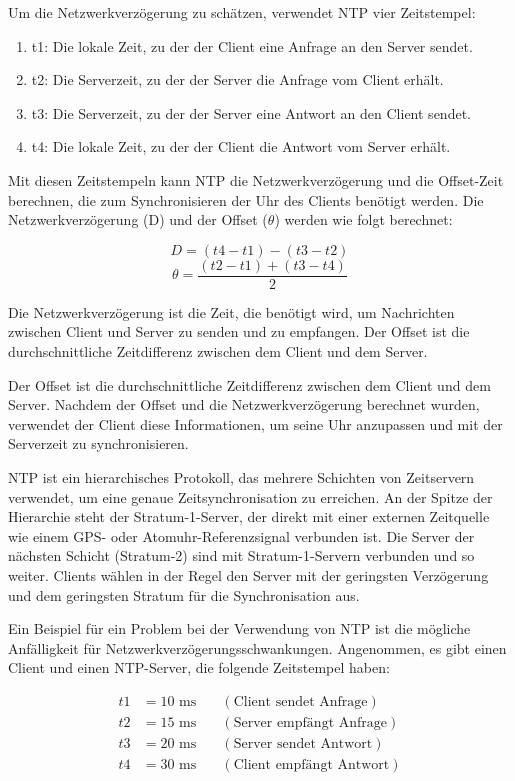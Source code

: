 Um die Netzwerkverzögerung zu schätzen, verwendet NTP vier Zeitstempel:

\begin{enumerate}
\item t1: Die lokale Zeit, zu der der Client eine Anfrage an den Server sendet.
\item t2: Die Serverzeit, zu der der Server die Anfrage vom Client erhält.
\item t3: Die Serverzeit, zu der der Server eine Antwort an den Client sendet.
\item t4: Die lokale Zeit, zu der der Client die Antwort vom Server erhält.
\end{enumerate}

Mit diesen Zeitstempeln kann NTP die Netzwerkverzögerung und die Offset-Zeit berechnen, die zum Synchronisieren der Uhr des Clients benötigt werden. Die Netzwerkverzögerung (D) und der Offset (\(\theta\)) werden wie folgt berechnet:

\[ D = (t4 - t1) - (t3 - t2) \]
\[ \theta = \frac{(t2 - t1) + (t3 - t4)}{2} \]

Die Netzwerkverzögerung ist die Zeit, die benötigt wird, um Nachrichten zwischen Client und Server zu senden und zu empfangen. Der Offset ist die durchschnittliche Zeitdifferenz zwischen dem Client und dem Server.

Der Offset ist die durchschnittliche Zeitdifferenz zwischen dem Client und dem Server. Nachdem der Offset und die Netzwerkverzögerung berechnet wurden, verwendet der Client diese Informationen, um seine Uhr anzupassen und mit der Serverzeit zu synchronisieren.

NTP ist ein hierarchisches Protokoll, das mehrere Schichten von Zeitservern verwendet, um eine genaue Zeitsynchronisation zu erreichen. An der Spitze der Hierarchie steht der Stratum-1-Server, der direkt mit einer externen Zeitquelle wie einem GPS- oder Atomuhr-Referenzsignal verbunden ist. Die Server der nächsten Schicht (Stratum-2) sind mit Stratum-1-Servern verbunden und so weiter. Clients wählen in der Regel den Server mit der geringsten Verzögerung und dem geringsten Stratum für die Synchronisation aus.

Ein Beispiel für ein Problem bei der Verwendung von NTP ist die mögliche Anfälligkeit für Netzwerkverzögerungsschwankungen. Angenommen, es gibt einen Client und einen NTP-Server, die folgende Zeitstempel haben:

\begin{align*}
t1 &= 10 \text{ ms} \quad &(\text{Client sendet Anfrage}) \\
t2 &= 15 \text{ ms} \quad &(\text{Server empfängt Anfrage}) \\
t3 &= 20 \text{ ms} \quad &(\text{Server sendet Antwort}) \\
t4 &= 30 \text{ ms} \quad &(\text{Client empfängt Antwort})
\end{align*}

